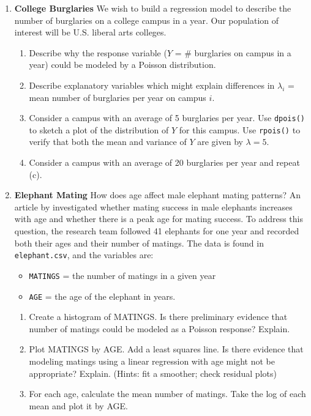 \documentclass[
]{krantz}
\providecommand{\tightlist}{%
  \setlength{\itemsep}{0pt}\setlength{\parskip}{0pt}}
\begin{document}
\begin{enumerate}
\def\labelenumi{\arabic{enumi}.}
\tightlist
\item
  \textbf{College Burglaries} We wish to build a regression model to describe the number of burglaries on a college campus in a year. Our population of interest will be U.S. liberal arts colleges.

  \begin{enumerate}
  \def\labelenumii{\alph{enumii}.}
  \tightlist
  \item
    Describe why the response variable (\(Y\) = \# burglaries on campus in a year) could be modeled by a Poisson distribution.
  \item
    Describe explanatory variables which might explain differences in \(\lambda_i\) = mean number of burglaries per year on campus \(i\).
  \item
    Consider a campus with an average of 5 burglaries per year. Use \texttt{dpois()} to sketch a plot of the distribution of \(Y\) for this campus. Use \texttt{rpois()} to verify that both the mean and variance of \(Y\) are given by \(\lambda=5\).
  \item
    Consider a campus with an average of 20 burglaries per year and repeat (c).
  \end{enumerate}
\item
  \textbf{Elephant Mating} How does age affect male elephant mating patterns? An article by \citet{Poole1989} investigated whether mating success in male elephants increases with age and whether there is a peak age for mating success. To address this question, the research team followed 41 elephants for one year and recorded both their ages and their number of matings. The data \citep{Ramsey2002} is found in \texttt{elephant.csv}, and the variables are:

  \begin{itemize}
  \tightlist
  \item
    \texttt{MATINGS} = the number of matings in a given year
  \item
    \texttt{AGE} = the age of the elephant in years.
  \end{itemize}

  \begin{enumerate}
  \def\labelenumii{\alph{enumii}.}
  \tightlist
  \item
    Create a histogram of MATINGS. Is there preliminary evidence that number of matings could be modeled as a Poisson response? Explain.
  \item
    Plot MATINGS by AGE. Add a least squares line. Is there evidence that modeling matings using a linear regression with age might not be appropriate? Explain. (Hints: fit a smoother; check residual plots)
  \item
    For each age, calculate the mean number of matings. Take the log of each mean and plot it by AGE.


\end{enumerate}
\end{enumerate}
\end{document}
